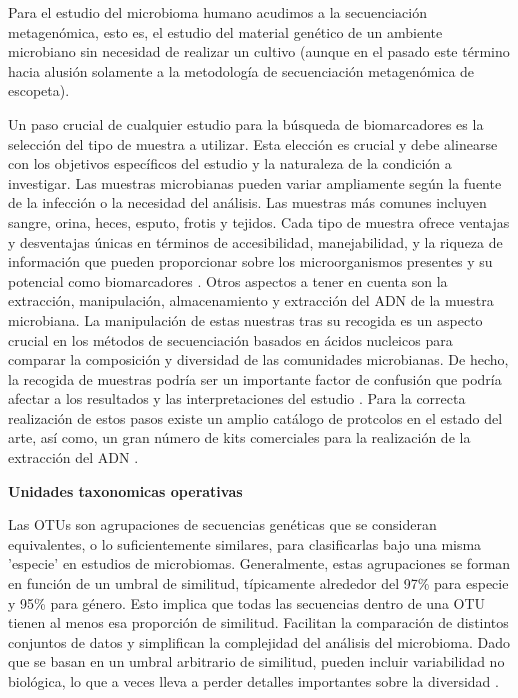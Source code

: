 
Para el estudio del microbioma humano acudimos a la secuenciación metagenómica, esto es, el estudio del material genético de un ambiente microbiano sin necesidad de realizar un cultivo (aunque en el pasado este término hacia alusión solamente a la metodología de secuenciación metagenómica de escopeta).

Un paso crucial de cualquier estudio para la búsqueda de biomarcadores es la selección del tipo de muestra a utilizar. Esta elección es crucial y debe alinearse con los objetivos específicos del estudio y la naturaleza de la condición a investigar. Las muestras microbianas pueden variar ampliamente según la fuente de la infección o la necesidad del análisis. Las muestras más comunes incluyen sangre, orina, heces, esputo, frotis y tejidos. Cada tipo de muestra ofrece ventajas y desventajas únicas en términos de accesibilidad, manejabilidad, y la riqueza de información que pueden proporcionar sobre los microorganismos presentes y su potencial como biomarcadores \cite{claesson2017clinician}. Otros aspectos a tener en cuenta son la extracción, manipulación, almacenamiento y extracción del ADN de la muestra microbiana. La manipulación de estas nuestras tras su recogida es un aspecto crucial en los métodos de secuenciación basados en ácidos nucleicos para comparar la composición y diversidad de las comunidades microbianas. De hecho, la recogida de muestras podría ser un importante factor de confusión que podría afectar a los resultados y las interpretaciones del estudio \cite{thomas2012metagenomics}. Para la correcta realización de estos pasos existe un amplio catálogo de protcolos en el estado del arte, así como, un gran número de kits comerciales para la realización de la extracción del ADN \cite{claesson2017clinician}.



\textbf{Unidades taxonomicas operativas}

Las OTUs son agrupaciones de secuencias genéticas que se consideran equivalentes, o lo suficientemente similares, para clasificarlas bajo una misma 'especie' en estudios de microbiomas. Generalmente, estas agrupaciones se forman en función de un umbral de similitud, típicamente alrededor del 97\% para especie y 95\% para género. Esto implica que todas las secuencias dentro de una OTU tienen al menos esa proporción de similitud. Facilitan la comparación de distintos conjuntos de datos y simplifican la complejidad del análisis del microbioma. Dado que se basan en un umbral arbitrario de similitud, pueden incluir variabilidad no biológica, lo que a veces lleva a perder detalles importantes sobre la diversidad \cite{schloss2011assessing, edgar2018updating}.

